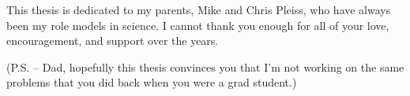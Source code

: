 This thesis is dedicated to my parents, Mike and Chris Pleiss, who have always been my role models in science.
I cannot thank you enough for all of your love, encouragement, and support over the years.

\vspace{2em}
{\small
  (P.S. -- Dad, hopefully this thesis convinces you that I'm not working on the same problems that you did back when you were a grad student.)
}
